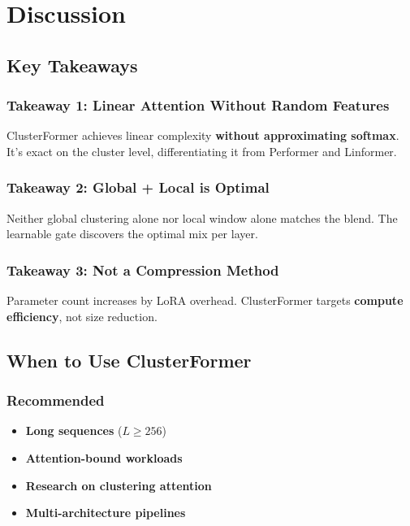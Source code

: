 \section{Discussion}

\subsection{Key Takeaways}

\subsubsection{Takeaway 1: Linear Attention Without Random Features}

ClusterFormer achieves linear complexity \textbf{without approximating softmax}. 
It's exact on the cluster level, differentiating it from Performer and 
Linformer.

\subsubsection{Takeaway 2: Global + Local is Optimal}

Neither global clustering alone nor local window alone matches the blend. 
The learnable gate discovers the optimal mix per layer.

\subsubsection{Takeaway 3: Not a Compression Method}

Parameter count increases by LoRA overhead. ClusterFormer targets 
\textbf{compute efficiency}, not size reduction.

\subsection{When to Use ClusterFormer}

\subsubsection{Recommended}

\begin{itemize}
\item \textbf{Long sequences} ($L \geq 256$)
\item \textbf{Attention-bound workloads}
\item \textbf{Research on clustering attention}
\item \textbf{Multi-architecture pipelines}

\end{itemize}
